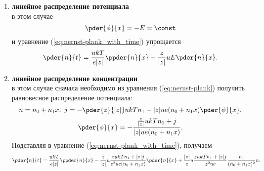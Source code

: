 \documentclass{hedwork}
\begin{document}
    \begin{enumerate}
        \item \textbf{линейное распределение потенциала}\\
            в этом случае
            \[
                \pder{\phi}{x} = -E = \const
            \]
            и уравнение (\ref{eq:nernst-plank_with_time}) упрощается
            \begin{equation}
                \pder{n}{t} = \frac{ukT}{e|z|}\ppder{n}{x} -
                    \frac{z}{|z|}uE\pder{n}{x}.
            \end{equation}
        \item \textbf{линейное распределение концентрации}\\
            в этом случае сначала необходимо из уравнения
            (\ref{eq:nernst-plank}) получить равновесное распределение
            потенциала:
            \[
                n = n_0 + n_1 x,\ j = -\pder{z}{|z|}ukTn_1 -
                    |z|ue(n_0+n_1x)\pder{\phi}{x},
            \]
            \[
                \pder{\phi}{x} = -\frac{\frac{z}{|z|}ukTn_1+j}{|z|ue(n_0+n_1x)}.
            \]
            Подставляя в уравнение (\ref{eq:nernst-plank_with_time}), получаем
            \begin{equation}
                \pder{n}{t} = \frac{ukT}{e|z|}\ppder{n}{x} -
                \frac{z}{|z|}u\frac{zukTn_1+|z|j}{z^2ue(n_0+n_1x)}\pder{n}{x}+
                \frac{|z|}{z}u\frac{zukTn_1+|z|j}{z^2ue}
                \frac{n_1}{(n_0+n_1x)^2}n.
            \end{equation}
    \end{enumerate}
\end{document}
